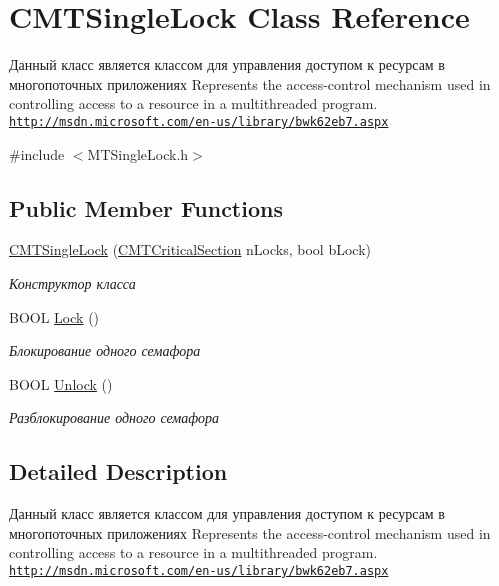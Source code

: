 \hypertarget{class_c_m_t_single_lock}{\section{C\+M\+T\+Single\+Lock Class Reference}
\label{class_c_m_t_single_lock}
}


Данный класс является классом для управления доступом к ресурсам в многопоточных приложениях Represents the access-\/control mechanism used in controlling access to a resource in a multithreaded program. \href{http://msdn.microsoft.com/en-us/library/bwk62eb7.aspx}{\tt http\+://msdn.\+microsoft.\+com/en-\/us/library/bwk62eb7.\+aspx}  




{\ttfamily \#include $<$M\+T\+Single\+Lock.\+h$>$}

\subsection*{Public Member Functions}
\begin{DoxyCompactItemize}
\item 
\hyperlink{class_c_m_t_single_lock_a71526b0b0a7d2ff6c8b32717f50e4424}{C\+M\+T\+Single\+Lock} (\hyperlink{class_c_m_t_critical_section}{C\+M\+T\+Critical\+Section} n\+Locks, bool b\+Lock)
\begin{DoxyCompactList}\small\item\em Конструктор класса \end{DoxyCompactList}\item 
B\+O\+O\+L \hyperlink{class_c_m_t_single_lock_a7586857614ac3719accc53d56e97573c}{Lock} ()
\begin{DoxyCompactList}\small\item\em Блокирование одного семафора \end{DoxyCompactList}\item 
B\+O\+O\+L \hyperlink{class_c_m_t_single_lock_a16f80923c0768c3814be13c4061d4c53}{Unlock} ()
\begin{DoxyCompactList}\small\item\em Разблокирование одного семафора \end{DoxyCompactList}\end{DoxyCompactItemize}


\subsection{Detailed Description}
Данный класс является классом для управления доступом к ресурсам в многопоточных приложениях Represents the access-\/control mechanism used in controlling access to a resource in a multithreaded program. \href{http://msdn.microsoft.com/en-us/library/bwk62eb7.aspx}{\tt http\+://msdn.\+microsoft.\+com/en-\/us/library/bwk62eb7.\+aspx} 



